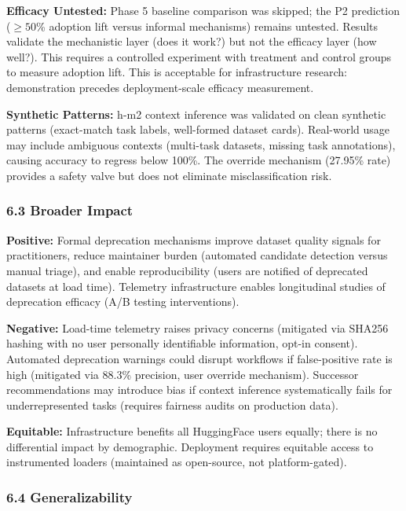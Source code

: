 \textbf{Efficacy Untested:} Phase 5 baseline comparison was skipped; the P2 prediction ($\geq 50$\% adoption lift versus informal mechanisms) remains untested. Results validate the mechanistic layer (does it work?) but not the efficacy layer (how well?). This requires a controlled experiment with treatment and control groups to measure adoption lift. This is acceptable for infrastructure research: demonstration precedes deployment-scale efficacy measurement.

\textbf{Synthetic Patterns:} h-m2 context inference was validated on clean synthetic patterns (exact-match task labels, well-formed dataset cards). Real-world usage may include ambiguous contexts (multi-task datasets, missing task annotations), causing accuracy to regress below 100\%. The override mechanism (27.95\% rate) provides a safety valve but does not eliminate misclassification risk.

\subsubsection{6.3 Broader Impact}

\textbf{Positive:} Formal deprecation mechanisms improve dataset quality signals for practitioners, reduce maintainer burden (automated candidate detection versus manual triage), and enable reproducibility (users are notified of deprecated datasets at load time). Telemetry infrastructure enables longitudinal studies of deprecation efficacy (A/B testing interventions).

\textbf{Negative:} Load-time telemetry raises privacy concerns (mitigated via SHA256 hashing with no user personally identifiable information, opt-in consent). Automated deprecation warnings could disrupt workflows if false-positive rate is high (mitigated via 88.3\% precision, user override mechanism). Successor recommendations may introduce bias if context inference systematically fails for underrepresented tasks (requires fairness audits on production data).

\textbf{Equitable:} Infrastructure benefits all HuggingFace users equally; there is no differential impact by demographic. Deployment requires equitable access to instrumented loaders (maintained as open-source, not platform-gated).

\subsubsection{6.4 Generalizability}

